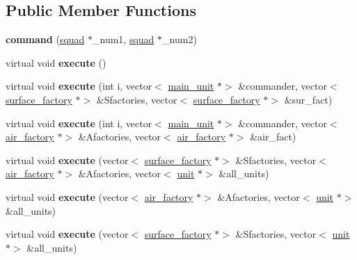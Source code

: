 \subsection*{Public Member Functions}
\begin{DoxyCompactItemize}
\item 
\mbox{\label{classcommand_af1bc3a3c76e881ead2a750d7a6bbbc57}} 
{\bfseries command} (\mbox{\hyperlink{classsquad}{squad}} $\ast$\+\_\+num1, \mbox{\hyperlink{classsquad}{squad}} $\ast$\+\_\+num2)
\item 
\mbox{\label{classcommand_a0b75272a7b935f50a15d32f88468d400}} 
virtual void {\bfseries execute} ()
\item 
\mbox{\label{classcommand_ada1e4caeb342f04b40990de4abd9cd08}} 
virtual void {\bfseries execute} (int i, vector$<$ \mbox{\hyperlink{classmain__unit}{main\+\_\+unit}} $\ast$$>$ \&commander, vector$<$ \mbox{\hyperlink{classsurface__factory}{surface\+\_\+factory}} $\ast$$>$ \&Sfactories, vector$<$ \mbox{\hyperlink{classsurface__factory}{surface\+\_\+factory}} $\ast$$>$ \&sur\+\_\+fact)
\item 
\mbox{\label{classcommand_a4ad079d30390f9dd0ba29cc570c82ccf}} 
virtual void {\bfseries execute} (int i, vector$<$ \mbox{\hyperlink{classmain__unit}{main\+\_\+unit}} $\ast$$>$ \&commander, vector$<$ \mbox{\hyperlink{classair__factory}{air\+\_\+factory}} $\ast$$>$ \&Afactories, vector$<$ \mbox{\hyperlink{classair__factory}{air\+\_\+factory}} $\ast$$>$ \&air\+\_\+fact)
\item 
\mbox{\label{classcommand_aa7bc94fa393e4b052581d34153b2d246}} 
virtual void {\bfseries execute} (vector$<$ \mbox{\hyperlink{classsurface__factory}{surface\+\_\+factory}} $\ast$$>$ \&Sfactories, vector$<$ \mbox{\hyperlink{classair__factory}{air\+\_\+factory}} $\ast$$>$ \&Afactories, vector$<$ \mbox{\hyperlink{classunit}{unit}} $\ast$$>$ \&all\+\_\+units)
\item 
\mbox{\label{classcommand_aa4cc58bbcfbaae8e272af56f2a151ef1}} 
virtual void {\bfseries execute} (vector$<$ \mbox{\hyperlink{classair__factory}{air\+\_\+factory}} $\ast$$>$ \&Afactories, vector$<$ \mbox{\hyperlink{classunit}{unit}} $\ast$$>$ \&all\+\_\+units)
\item 
\mbox{\label{classcommand_a1de78d90b3c4ee0532dc67e348c760ea}} 
virtual void {\bfseries execute} (vector$<$ \mbox{\hyperlink{classsurface__factory}{surface\+\_\+factory}} $\ast$$>$ \&Sfactories, vector$<$ \mbox{\hyperlink{classunit}{unit}} $\ast$$>$ \&all\+\_\+units)
\end{DoxyCompactItemize}
